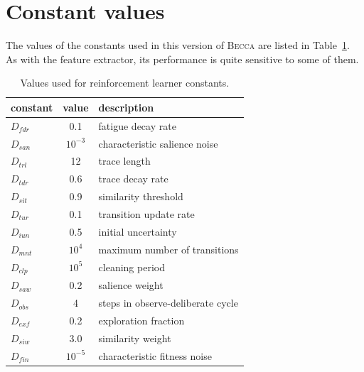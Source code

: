 \section{Constant values}

The values of the constants used in this version of \textsc{Becca} are listed in Table~\ref{actor_constants}. As with the feature extractor, its performance is quite sensitive to some of them.

\begin{table}[htdp]
\caption{Values used for reinforcement learner constants.}
\begin{center}
\begin{tabular}{|l|c|l|}
\hline
constant & value & description\\
\hline
$D_{fdr}$ & 0.1& fatigue decay rate\\
$D_{san}$ & $10^{-3}$& characteristic salience noise\\
$D_{trl}$ & 12& trace length\\
$D_{tdr}$ & 0.6 & trace decay rate \\
$D_{sit}$ & 0.9& similarity threshold\\
$D_{tur}$ & 0.1& transition update rate\\
$D_{iun}$ & 0.5 & initial uncertainty \\
$D_{mnt}$ & $10^4$& maximum number of transitions\\
$D_{clp}$ & $10^5$& cleaning period\\
$D_{saw}$ & 0.2& salience weight\\
$D_{obs}$ & 4& steps in observe-deliberate cycle\\
$D_{exf}$ & 0.2& exploration fraction\\
$D_{siw}$ & 3.0& similarity weight\\
$D_{fin}$ & $10^{-5}$& characteristic fitness noise \\
\hline
\end{tabular}
\end{center}
\label{actor_constants}
\end{table}%



